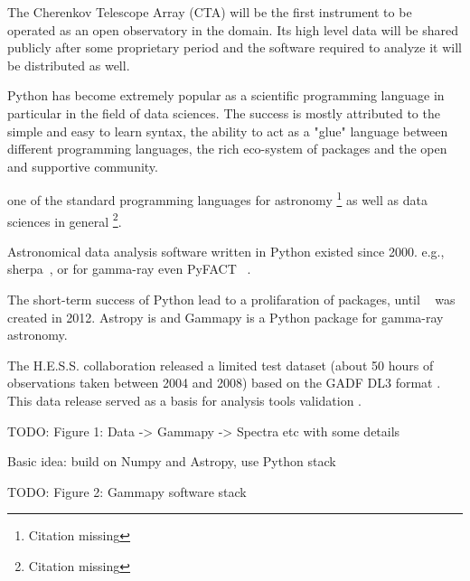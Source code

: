 The Cherenkov Telescope Array (CTA) will be the first instrument to be operated
as an open observatory in the domain. Its high level data will be shared publicly after
some proprietary period and the software required to analyze it will be distributed
as well.


Python has become extremely popular as a scientific programming language
in particular in the field of data sciences. The success is
mostly attributed to the simple and easy to learn syntax, the ability to act as
a "glue" language between different programming languages, the rich eco-system
of packages and the open and supportive community.

 one of the
standard programming  languages for astronomy \footnote{Citation missing} as
well as data sciences in  general \footnote{Citation missing}.

Astronomical data analysis software written in Python existed since 2000. e.g.,
sherpa~\citep{sherpa-2011, sherpa-2009}, or for gamma-ray even PyFACT
~\citep{pyfact}.

The short-term success of Python lead to a prolifaration of packages, until
\astropy~\citep{astropy} was created in 2012. Astropy is and Gammapy is a
Python package for gamma-ray astronomy.


The H.E.S.S. collaboration released a limited test dataset (about 50 hours of
observations taken between 2004 and 2008) based  on the GADF DL3 format \citep{HESS_DR1}.
This data release served as a basis for analysis tools validation \cite[see e.g.]{Mohrmann2019}.

TODO: Figure 1: Data -> Gammapy -> Spectra etc with some details

Basic idea: build on Numpy and Astropy, use Python stack

TODO: Figure 2: Gammapy software stack


